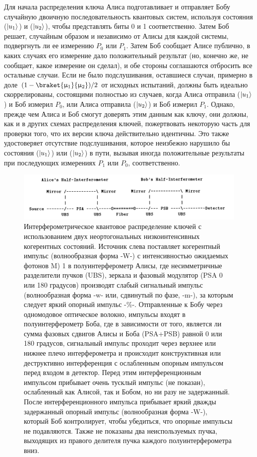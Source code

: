 Для начала распределения ключа Алиса подготавливает и отправляет Бобу случайную двоичную последовательность квантовых систем, используя состояния ($\lvert u_1\rangle$) и ($\lvert u_2\rangle$), чтобы представлять биты 0 и 1 соответственно. Затем Боб решает, случайным образом и независимо от Алисы для каждой системы, подвергнуть ли ее измерению $P_0$ или $P_1$. Затем Боб сообщает Алисе публично, в каких случаях его измерение дало положительный результат (но, конечно же, не сообщает, какое измерение он сделал), и обе стороны соглашаются отбросить все остальные случаи. Если не было подслушивания, оставшиеся случаи, примерно в доле $(1 -\braket{\mu_1}{\mu_2})/2$ от исходных испытаний, должны быть идеально скоррелированы, состоящими полностью из случаев, когда Алиса отправила ($\lvert u_1\rangle$) и Боб измерил $P_0$, или Алиса отправила ($\lvert u_2\rangle$) и Боб измерил $P_1$. Однако, прежде чем Алиса и Боб смогут доверять этим данным как ключу, они должны, как и в других схемах распределения ключей, пожертвовать некоторую часть для проверки того, что их версии ключа действительно идентичны. Это также удостоверяет отсутствие подслушивания, которое неизбежно нарушило бы состояния ($\lvert u_1\rangle$) или ($\lvert u_2\rangle$) в пути, вызывая иногда положительные результаты при последующих измерениях $P_1$ или $P_0$, соответственно.
\begin{figure}
    \centering
    \includegraphics[width=\linewidth]{images/B92 scheme from article.png}
    \caption{Интерферометрическое квантовое распределение ключей с использованием двух неортогональных низкоинтенсивных когерентных состояний. Источник слева поставляет когерентный импульс (волнообразная форма -W-) с интенсивностью ожидаемых фотонов M) 1 в полуинтерферометр Алисы, где несимметричные разделители пучков (UBS), зеркала и фазовый модулятор (PSA 0 или 180 градусов) производят слабый сигнальный импульс (волнообразная форма -w- или, сдвинутый по фазе, -m-), за которым следует яркий опорный импульс -\%-. Отправленные к Бобу через одномодовое оптическое волокно, импульсы входят в полуинтерферометр Боба, где в зависимости от того, является ли сумма фазовых сдвигов Алисы и Боба (PSA+PSB) равной 0 или 180 градусов, сигнальный импульс проходит через верхнее  или нижнее плечо интерферометра и происходит конструктивная или деструктивно интерференция с ослабленным опорным импульсом перед входом в детектор. Перед этим интерференционным импульсом прибывает очень тусклый импульс (не показан), ослабленный как Алисой, так и Бобом, но ни разу не задержанный. После интерференционного импульса прибывает яркий дважды задержанный опорный импульс (волнообразная форма -W-), который Боб контролирует, чтобы убедиться, что опорные импульсы не подавляются. Также не показаны два неиспользуемых пучка, выходящих из правого делителя пучка  каждого полуинтерферометра вниз.}
    \label{fig:B92 sch lit}
\end{figure}
